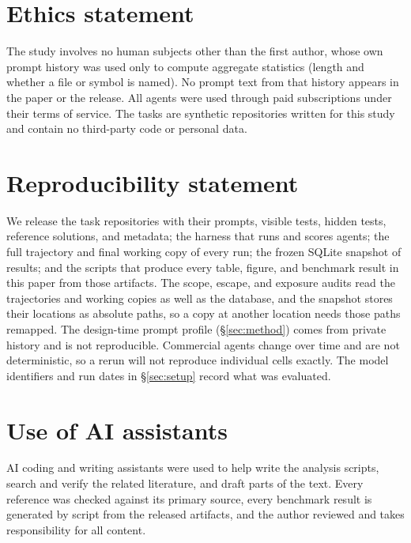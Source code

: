 \section*{Ethics statement}

The study involves no human subjects other than the first author, whose own
prompt history was used only to compute aggregate statistics (length and
whether a file or symbol is named). No prompt text from that history appears
in the paper or the release. All agents were used through paid subscriptions
under their terms of service. The tasks are synthetic repositories written for
this study and contain no third-party code or personal data.

\section*{Reproducibility statement}

We release the task repositories with their prompts, visible tests, hidden
tests, reference solutions, and metadata; the harness that runs and scores
agents; the full trajectory and final working copy of every run; the frozen
SQLite snapshot of results; and the scripts that produce every table, figure,
and benchmark result in this paper from those artifacts. The scope, escape,
and exposure audits read the trajectories and working copies as well as the
database, and the snapshot stores their locations as absolute paths, so a
copy at another location needs those paths remapped. The design-time prompt
profile (\S\ref{sec:method}) comes from private history and is not
reproducible. Commercial agents change over time and are not
deterministic, so a rerun will not reproduce individual cells exactly. The
model identifiers and run dates in \S\ref{sec:setup} record what was
evaluated.

\section*{Use of AI assistants}

AI coding and writing assistants were used to help write the analysis
scripts, search and verify the related literature, and draft parts of the
text. Every reference was checked against its primary source, every benchmark
result is generated by script from the released artifacts, and the author reviewed
and takes responsibility for all content.
